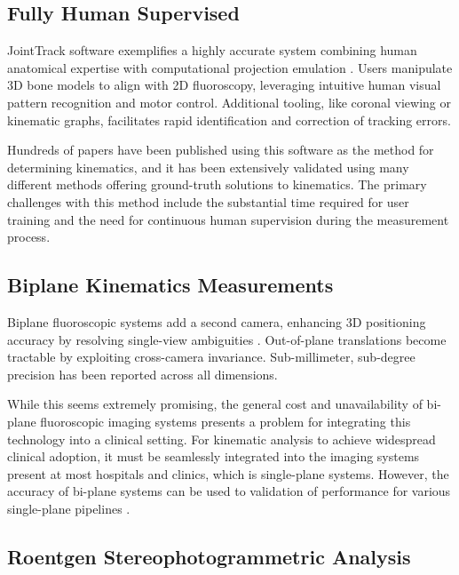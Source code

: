 \subsection{Fully Human Supervised}

JointTrack software exemplifies a highly accurate system combining human anatomical expertise with computational projection emulation \cite{muJointTrackOpenSourceEasily2007}.
Users manipulate 3D bone models to align with 2D fluoroscopy, leveraging intuitive human visual pattern recognition and motor control.
Additional tooling, like coronal viewing or kinematic graphs, facilitates rapid identification and correction of tracking errors.

Hundreds of papers have been published using this software as the method for determining kinematics, and it has been extensively validated using many different methods offering ground-truth solutions to kinematics.
The primary challenges with this method include the substantial time required for user training and the need for continuous human supervision during the measurement process.

\subsection{Biplane Kinematics Measurements}

Biplane fluoroscopic systems add a second camera, enhancing 3D positioning accuracy by resolving single-view ambiguities \cite{burtonAutomaticTrackingHealthy2021,youVivoMeasurement3D2001,bakaStatisticalShapeModelBased2012}.
Out-of-plane translations become tractable by exploiting cross-camera invariance.
Sub-millimeter, sub-degree precision has been reported across all dimensions.

While this seems extremely promising, the general cost and unavailability of bi-plane fluoroscopic imaging systems presents a problem for integrating this technology into a clinical setting.
For kinematic analysis to achieve widespread clinical adoption, it must be seamlessly integrated into the imaging systems present at most hospitals and clinics, which is single-plane systems.
However, the accuracy of bi-plane systems can be used to validation of performance for various single-plane pipelines \cite{brobergValidationMachineLearning2023}.

\subsection{Roentgen Stereophotogrammetric Analysis}


